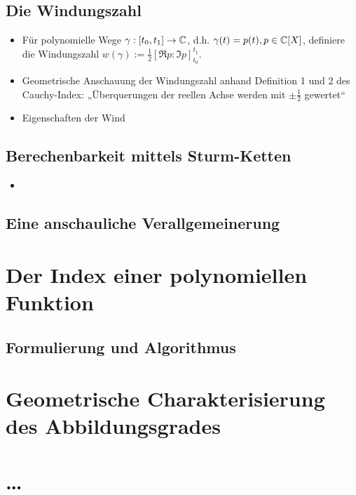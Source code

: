\documentclass{mythesis}
\begin{document}
\subsection{Die Windungszahl}

\begin{itemize}
    \item
	Für polynomielle Wege $\gamma: [t_0, t_1] \to \mathbb { C }$, d.h. $\gamma(t) = p(t), p \in \mathbb { C }[X]$, definiere die Windungszahl
	\begin{math}
	    w(\gamma) := \frac{1}{2} [\Re p: \Im p]_{t_0}^{t_1}.
	\end{math}
    \item
	Geometrische Anschauung der Windungszahl anhand Definition 1 und 2 des Cauchy-Index:
	„Überquerungen der reellen Achse werden mit $\pm \frac{1}{2}$ gewertet“
    \item
	Eigenschaften der Wind
\end{itemize}

\subsection{Berechenbarkeit mittels Sturm-Ketten}

\begin{itemize}
    \item

\end{itemize}

\subsection{Eine anschauliche Verallgemeinerung}

\section{Der Index einer polynomiellen Funktion}

\subsection{Formulierung und Algorithmus}

\subsection{}

\section{Geometrische Charakterisierung des Abbildungsgrades}

\section{…}
\end{document}
